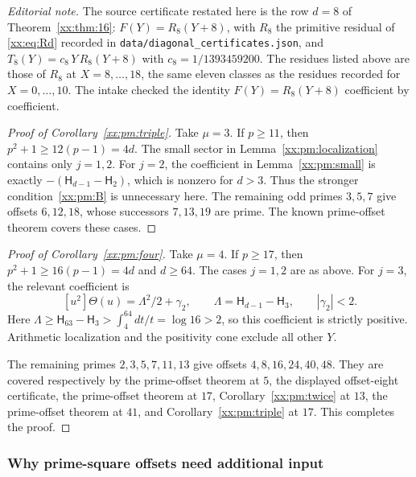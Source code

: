 \documentclass[11pt,a4paper]{article}
\numberwithin{equation}{section}
\theoremstyle{definition}
\theoremstyle{remark}
\theoremstyle{plain}
\newcommand{\coef}[2]{[#1^{#2}]}
\begin{document}
\emph{Editorial note.}  The source certificate restated here is the row $d=8$
of Theorem~\ref{xx:thm:16}: $F(Y)=R_8(Y+8)$, with $R_8$ the primitive residual
of \eqref{xx:eq:Rd} recorded in
\texttt{data/\allowbreak diagonal\_\allowbreak certificates.json}, and
$T_8(Y)=c_8\,Y\,R_8(Y+8)$ with $c_8=1/1393459200$.  The residues listed above
are those of $R_8$ at $X=8,\ldots,18$, the same eleven classes as the residues
recorded for $X=0,\ldots,10$.  The intake checked the identity
$F(Y)=R_8(Y+8)$ coefficient by coefficient.

\begin{proof}[Proof of Corollary~\ref{xx:pm:triple}]
Take $\mu=3$. If $p\ge11$, then $p^2+1\ge12(p-1)=4d$. The small sector in
Lemma~\ref{xx:pm:localization} contains only $j=1,2$. For $j=2$, the
coefficient in Lemma~\ref{xx:pm:small} is exactly $-(\mathsf H_{d-1}-\mathsf
H_2)$, which is nonzero for $d>3$. Thus the stronger condition~\eqref{xx:pm:B}
is unnecessary here. The remaining odd primes $3,5,7$ give offsets $6,12,18$,
whose successors $7,13,19$ are prime. The known prime-offset theorem covers
these cases.
\end{proof}

\begin{proof}[Proof of Corollary~\ref{xx:pm:four}]
Take $\mu=4$. If $p\ge17$, then $p^2+1\ge16(p-1)=4d$ and $d\ge64$. The cases
$j=1,2$ are as above. For $j=3$, the relevant coefficient is
\[
 \coef{u}{2}\Theta(u)=\Lambda^2/2+\gamma_2,\qquad
 \Lambda=\mathsf H_{d-1}-\mathsf H_3,\qquad |\gamma_2|<2.
\]
Here
$\Lambda\ge\mathsf H_{63}-\mathsf H_3>\int_4^{64}dt/t=\log16>2$,
so this coefficient is strictly positive. Arithmetic localization and the
positivity cone exclude all other $Y$.

The remaining primes $2,3,5,7,11,13$ give offsets $4,8,16,24,40,48$. They are
covered respectively by the prime-offset theorem at $5$, the displayed
offset-eight certificate, the prime-offset theorem at $17$,
Corollary~\ref{xx:pm:twice} at $13$, the prime-offset theorem at $41$, and
Corollary~\ref{xx:pm:triple} at $17$. This completes the proof.
\end{proof}

\subsubsection{Why prime-square offsets need additional input}\label{xx:pm:sec:square}
\end{document}
